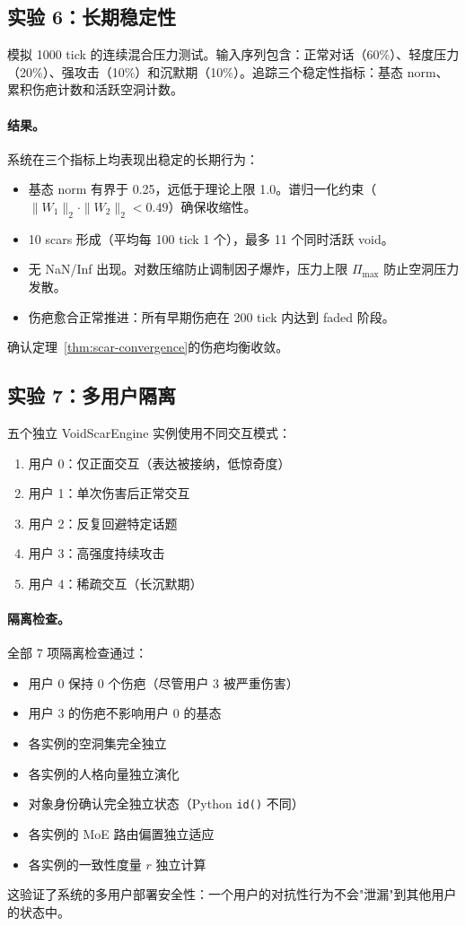 \documentclass[11pt]{article}
\begin{document}
\subsection{实验 6：长期稳定性}

模拟 1000 tick 的连续混合压力测试。输入序列包含：正常对话（60\%）、轻度压力（20\%）、强攻击（10\%）和沉默期（10\%）。追踪三个稳定性指标：基态 norm、累积伤疤计数和活跃空洞计数。

\paragraph{结果。}系统在三个指标上均表现出稳定的长期行为：
\begin{itemize}
\item 基态 norm 有界于 0.25，远低于理论上限 1.0。谱归一化约束（$\|W_1\|_2 \cdot \|W_2\|_2 < 0.49$）确保收缩性。
\item 10 scars 形成（平均每 100 tick 1 个），最多 11 个同时活跃 void。
\item 无 NaN/Inf 出现。对数压缩防止调制因子爆炸，压力上限 $\Pi_{\max}$ 防止空洞压力发散。
\item 伤疤愈合正常推进：所有早期伤疤在 200 tick 内达到 faded 阶段。
\end{itemize}
确认定理~\ref{thm:scar-convergence}的伤疤均衡收敛。

\subsection{实验 7：多用户隔离}

五个独立 VoidScarEngine 实例使用不同交互模式：
\begin{enumerate}
\item 用户 0：仅正面交互（表达被接纳，低惊奇度）
\item 用户 1：单次伤害后正常交互
\item 用户 2：反复回避特定话题
\item 用户 3：高强度持续攻击
\item 用户 4：稀疏交互（长沉默期）
\end{enumerate}

\paragraph{隔离检查。}全部 7 项隔离检查通过：
\begin{itemize}
\item 用户 0 保持 0 个伤疤（尽管用户 3 被严重伤害）
\item 用户 3 的伤疤不影响用户 0 的基态
\item 各实例的空洞集完全独立
\item 各实例的人格向量独立演化
\item 对象身份确认完全独立状态（Python \texttt{id()} 不同）
\item 各实例的 MoE 路由偏置独立适应
\item 各实例的一致性度量 $r$ 独立计算
\end{itemize}
这验证了系统的多用户部署安全性：一个用户的对抗性行为不会"泄漏"到其他用户的状态中。
\end{document}
